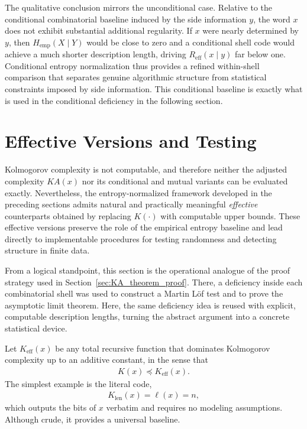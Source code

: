 \documentclass[12pt]{article}
\begin{document}
The qualitative conclusion mirrors the unconditional case. Relative to the
conditional combinatorial baseline induced by the side information $y$, the
word $x$ does not exhibit substantial additional regularity. If $x$ were nearly
determined by $y$, then $H_{\mathrm{emp}}(X\mid Y)$ would be close to zero and a
conditional shell code would achieve a much shorter description length, driving
$R_{\mathrm{eff}}(x\mid y)$ far below one. Conditional entropy normalization
thus provides a refined within-shell comparison that separates genuine
algorithmic structure from statistical constraints imposed by side information. This conditional baseline is exactly what is used in the conditional deficiency in the following section.

\section{Effective Versions and Testing}
\label{sec:effective_testing}

Kolmogorov complexity is not computable, and therefore neither the adjusted
complexity $KA(x)$ nor its conditional and mutual variants can be evaluated
exactly. Nevertheless, the entropy-normalized framework developed in the
preceding sections admits natural and practically meaningful \emph{effective}
counterparts obtained by replacing $K(\cdot)$ with computable upper bounds.
These effective versions preserve the role of the empirical entropy baseline
and lead directly to implementable procedures for testing randomness and
detecting structure in finite data.

From a logical standpoint, this section is the operational analogue of the proof
strategy used in Section~\ref{sec:KA_theorem_proof}. There, a deficiency inside
each combinatorial shell was used to construct a Martin L\"of test and to prove
the asymptotic limit theorem. Here, the same deficiency idea is reused with
explicit, computable description lengths, turning the abstract argument into a
concrete statistical device.

Let $K_{\mathrm{eff}}(x)$ be any total recursive function that dominates
Kolmogorov complexity up to an additive constant, in the sense that
\begin{eqnarray}
K(x) \preceq K_{\mathrm{eff}}(x).
\label{eq:Keff_dominates_K_clean}
\end{eqnarray}
The simplest example is the literal code,
\begin{eqnarray}
K_{\mathrm{len}}(x)=\ell(x)=n,
\end{eqnarray}
which outputs the bits of $x$ verbatim and requires no modeling assumptions.
Although crude, it provides a universal baseline.
\end{document}
